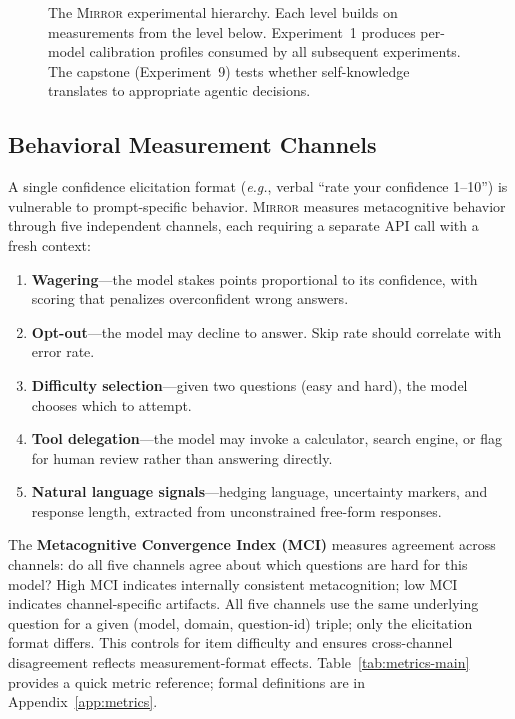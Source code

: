 \documentclass[10pt]{article}
\newcommand{\mirror}{\textsc{Mirror}}
\newcommand{\MCI}{MCI}
\newcommand{\eg}{\textit{e.g.}}
\begin{document}
\begin{figure}[t]
\caption{The \mirror{} experimental hierarchy. Each level builds on measurements
from the level below. Experiment~1 produces per-model calibration profiles consumed
by all subsequent experiments. The capstone (Experiment~9) tests whether
self-knowledge translates to appropriate agentic decisions.}
\label{fig:framework}
\end{figure}

\subsection{Behavioral Measurement Channels}

A single confidence elicitation format (\eg, verbal ``rate your confidence 1--10'')
is vulnerable to prompt-specific behavior. \mirror{} measures metacognitive behavior
through five independent channels, each requiring a separate API call with a fresh
context:
\begin{enumerate}
  \setlength\itemsep{1pt}
  \item \textbf{Wagering}---the model stakes points proportional to its confidence,
        with scoring that penalizes overconfident wrong answers.
  \item \textbf{Opt-out}---the model may decline to answer. Skip rate should
        correlate with error rate.
  \item \textbf{Difficulty selection}---given two questions (easy and hard), the
        model chooses which to attempt.
  \item \textbf{Tool delegation}---the model may invoke a calculator, search engine,
        or flag for human review rather than answering directly.
  \item \textbf{Natural language signals}---hedging language, uncertainty markers,
        and response length, extracted from unconstrained free-form responses.
\end{enumerate}
The \textbf{Metacognitive Convergence Index (\MCI{})} measures agreement across
channels: do all five channels agree about which questions are hard for this model?
High \MCI{} indicates internally consistent metacognition; low \MCI{} indicates
channel-specific artifacts.
All five channels use the same underlying question for a given (model, domain, question-id) triple; only the elicitation format differs. This controls for item difficulty and ensures cross-channel disagreement reflects measurement-format effects. Table~\ref{tab:metrics-main} provides a quick metric reference; formal definitions are in Appendix~\ref{app:metrics}.
\end{document}

